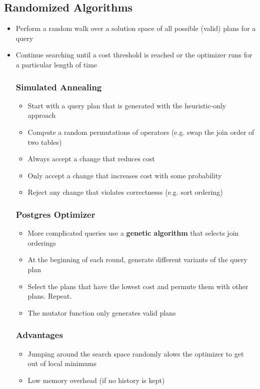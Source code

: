 \documentclass[11pt]{article}
\begin{document}
    \subsection*{Randomized Algorithms}
    \begin{itemize}
        \item Perform a random walk over a solution space of all possible (valid) plans for a query
        \item Continue searching until a cost threshold is reached or the optimizer runs for a particular length of time

        \subsubsection*{Simulated Annealing~\cite{p9-ioannidis}}
        \begin{itemize}
            \item Start with a query plan that is generated with the heuristic-only approach
            \item Compute a random permutations of operators (e.g. swap the join order of two tables)
            \item Always accept a change that reduces cost
            \item Only accept a change that increases cost with some probability
            \item Reject any change that violates correctnesss (e.g. sort ordering)
        \end{itemize}

        \subsubsection*{Postgres Optimizer}
        \begin{itemize}
            \item More complicated queries use a \textbf{genetic algorithm} that selects join orderings
            \item At the beginning of each round, generate different variants of the query plan
            \item Select the plans that have the lowest cost and permute them with other plans. Repeat.
            \item The mutator function only generates valid plans
        \end{itemize}

        \subsubsection*{Advantages}
        \begin{itemize}
            \item Jumping around the search space randomly alows the optimizer to get out of local minimums
            \item Low memory overhead (if no history is kept)
        \end{itemize}


\end{itemize}
\end{document}
